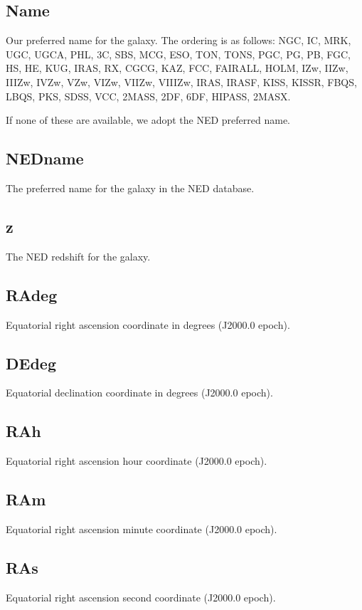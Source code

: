 \documentclass[iop]{emulateapj-rtx4}
\begin{document}
\subsection{Name}
Our preferred name for the galaxy. The ordering is as follows: NGC, IC, MRK, UGC, UGCA, PHL, 3C, SBS, MCG, ESO, TON, TONS, PGC, PG, PB, FGC, HS, HE, KUG, IRAS, RX, CGCG, KAZ, FCC, FAIRALL, HOLM, IZw, IIZw, IIIZw, IVZw, VZw, VIZw, VIIZw, VIIIZw, IRAS, IRASF, KISS, KISSR, FBQS, LBQS, PKS, SDSS, VCC, 2MASS, 2DF, 6DF, HIPASS, 2MASX.


If none of these are available, we adopt the NED preferred name.

\subsection{NEDname}
The preferred name for the galaxy in the NED database.

\subsection{z}
The NED redshift for the galaxy. 

\subsection{RAdeg}
Equatorial right ascension coordinate in degrees (J2000.0 epoch).

\subsection{DEdeg}
Equatorial declination coordinate in degrees (J2000.0 epoch).

\subsection{RAh}
Equatorial right ascension hour coordinate (J2000.0 epoch).

\subsection{RAm}
Equatorial right ascension minute coordinate (J2000.0 epoch).

\subsection{RAs}
Equatorial right ascension second coordinate (J2000.0 epoch).
\end{document}
